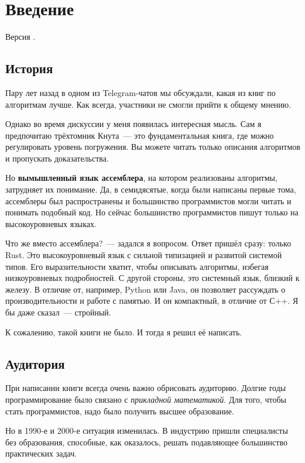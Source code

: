 \chapter{Введение}

Версия .

\section{История}

Пару лет назад в одном из Telegram-чатов мы обсуждали, какая из книг по алгоритмам лучше.
Как всегда, участники не смогли прийти к общему мнению.

Однако во время дискуссии у меня появилась интересная мысль.
Сам я предпочитаю трёхтомник Кнута~--- это фундаментальная книга, где можно регулировать уровень погружения.
Вы можете читать только описания алгоритмов и пропускать доказательства.

Но \textbf{вымышленный язык ассемблера}, на котором реализованы алгоритмы, затрудняет их понимание.
Да, в семидясятые, когда были написаны первые тома, ассемблеры был распространены и большинство программистов могли читать и понимать подобный код.
Но сейчас большинство программистов пишут только на высокоуровневых языках.

Что же вместо ассемблера?~--- задался я вопросом.
Ответ пришёл сразу: только Rust.
Это высокоуровневый язык с сильной типизацией и развитой системой типов.
Его выразительности хватит, чтобы описывать алгоритмы, избегая низкоуровневых подробностей.
С другой стороны, это системный язык, близкий к железу.
В отличие от, например, Python или Java, он позволяет рассуждать о производительности и работе с памятью.
И он компактный, в отличие от С++.
Я бы даже сказал~--- стройный.

К сожалению, такой книги не было. И тогда я решил её написать.

\section{Аудитория}

При написании книги всегда очень важно обрисовать аудиторию. Долгие годы программирование было связано с \textit{прикладной математикой}. Для того, чтобы стать программистов, надо было получить высшее образование.

Но в 1990-е и 2000-е ситуация изменилась. В индустрию пришли специалисты без образования, способные, как оказалось, решать подавляющее большинство практических задач.


